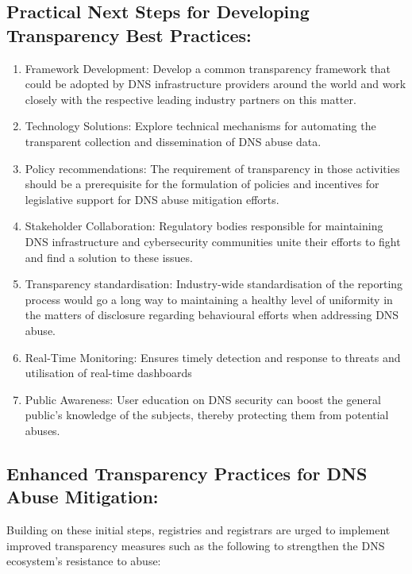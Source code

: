 \subsection{Practical Next Steps for Developing Transparency Best Practices: }

\begin{enumerate}
    \item Framework Development: Develop a common transparency framework that could be adopted by DNS infrastructure providers around the world and work closely with the respective leading industry partners on this matter.

    \item Technology Solutions: Explore technical mechanisms for automating the transparent collection and dissemination of DNS abuse data.

    \item Policy recommendations: The requirement of transparency in those activities should be a prerequisite for the formulation of policies and incentives for legislative support for DNS abuse mitigation efforts.
    
    \item Stakeholder Collaboration: Regulatory bodies responsible for maintaining DNS infrastructure and cybersecurity communities unite their efforts to fight and find a solution to these issues.
    
    \item Transparency standardisation: Industry-wide standardisation of the reporting process would go a long way to maintaining a healthy level of uniformity in the matters of disclosure regarding behavioural efforts when addressing DNS abuse.
    
    \item Real-Time Monitoring: Ensures timely detection and response to threats and utilisation of real-time dashboards
    
    \item  Public Awareness: User education on DNS security can boost the general public’s knowledge of the subjects, thereby protecting them from potential abuses.
\end{enumerate}


\subsection{Enhanced Transparency Practices for DNS Abuse Mitigation: }

Building on these initial steps, registries and registrars are urged to implement improved transparency measures such as the following to strengthen the DNS ecosystem's resistance to abuse:

